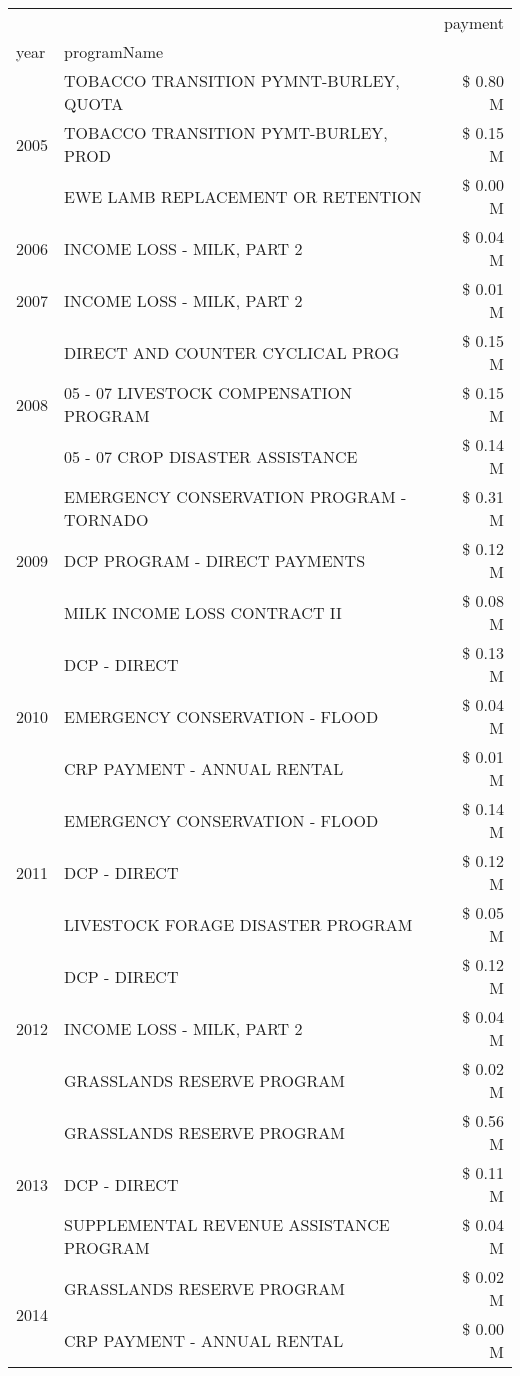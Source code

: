 \begin{tabular}{llr}
\toprule
 &  & payment \\
year & programName &  \\
\midrule
\multirow[t]{3}{*}{2005} & TOBACCO TRANSITION PYMNT-BURLEY, QUOTA & \$ 0.80 M \\
 & TOBACCO TRANSITION PYMT-BURLEY, PROD & \$ 0.15 M \\
 & EWE LAMB REPLACEMENT OR RETENTION & \$ 0.00 M \\
\cline{1-3}
2006 & INCOME LOSS - MILK, PART 2 & \$ 0.04 M \\
\cline{1-3}
2007 & INCOME LOSS - MILK, PART 2 & \$ 0.01 M \\
\cline{1-3}
\multirow[t]{3}{*}{2008} & DIRECT AND COUNTER CYCLICAL PROG & \$ 0.15 M \\
 & 05 - 07 LIVESTOCK COMPENSATION PROGRAM & \$ 0.15 M \\
 & 05 - 07 CROP DISASTER ASSISTANCE & \$ 0.14 M \\
\cline{1-3}
\multirow[t]{3}{*}{2009} & EMERGENCY CONSERVATION PROGRAM - TORNADO & \$ 0.31 M \\
 & DCP PROGRAM - DIRECT PAYMENTS & \$ 0.12 M \\
 & MILK INCOME LOSS CONTRACT II & \$ 0.08 M \\
\cline{1-3}
\multirow[t]{3}{*}{2010} & DCP - DIRECT & \$ 0.13 M \\
 & EMERGENCY CONSERVATION - FLOOD & \$ 0.04 M \\
 & CRP PAYMENT - ANNUAL RENTAL & \$ 0.01 M \\
\cline{1-3}
\multirow[t]{3}{*}{2011} & EMERGENCY CONSERVATION - FLOOD & \$ 0.14 M \\
 & DCP - DIRECT & \$ 0.12 M \\
 & LIVESTOCK FORAGE DISASTER PROGRAM & \$ 0.05 M \\
\cline{1-3}
\multirow[t]{3}{*}{2012} & DCP - DIRECT & \$ 0.12 M \\
 & INCOME LOSS - MILK, PART 2 & \$ 0.04 M \\
 & GRASSLANDS RESERVE PROGRAM & \$ 0.02 M \\
\cline{1-3}
\multirow[t]{3}{*}{2013} & GRASSLANDS RESERVE PROGRAM & \$ 0.56 M \\
 & DCP - DIRECT & \$ 0.11 M \\
 & SUPPLEMENTAL REVENUE ASSISTANCE PROGRAM & \$ 0.04 M \\
\cline{1-3}
\multirow[t]{2}{*}{2014} & GRASSLANDS RESERVE PROGRAM & \$ 0.02 M \\
 & CRP PAYMENT - ANNUAL RENTAL & \$ 0.00 M \\

\end{tabular}
